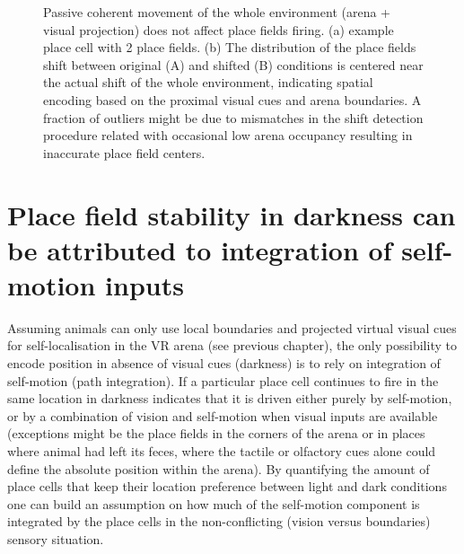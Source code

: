 \begin{figure}
\captionsetup{format=plain}
\caption[Spatial orientation relative to proximal cues]{
Passive coherent movement of the whole environment (arena + visual projection) does not affect place fields firing. (a) example place cell with 2 place fields. (b) The distribution of the place fields shift between original (A) and shifted (B) conditions is centered near the actual shift of the whole environment, indicating spatial encoding based on the proximal visual cues and arena boundaries. A fraction of outliers might be due to mismatches in the shift detection procedure related with occasional low arena occupancy resulting in inaccurate place field centers.
}
\label{fig:F16_proximal_cues_geometry}
\end{figure}


\section{Place field stability in darkness can be attributed to integration of self-motion inputs}
\label{sec:integration_of_sm_imputs}

Assuming animals can only use local boundaries and projected virtual visual cues for self-localisation in the VR arena (see previous chapter), the only possibility to encode position in absence of visual cues (darkness) is to rely on integration of self-motion (path integration). If a particular place cell continues to fire in the same location in darkness indicates that it is driven either purely by self-motion, or by a combination of vision and self-motion when visual inputs are available (exceptions might be the place fields in the corners of the arena or in places where animal had left its feces, where the tactile or olfactory cues alone could define the absolute position within the arena). By quantifying the amount of place cells that keep their location preference between light and dark conditions one can build an assumption on how much of the self-motion component is integrated by the place cells in the non-conflicting (vision versus boundaries) sensory situation.

